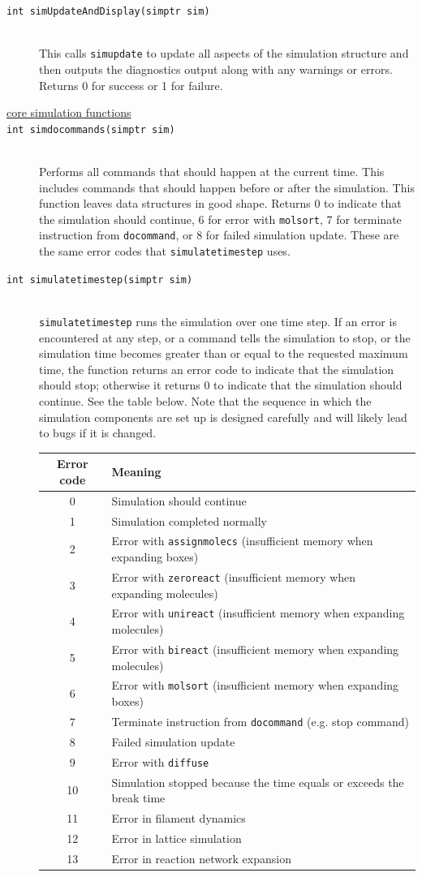 \documentclass {scrbook}
\newcommand {\ttt} {\texttt}
\begin{document}
\begin{description}
\item[\ttt{int simUpdateAndDisplay(simptr sim)}]
\hfill \\
This calls \ttt{simupdate} to update all aspects of the simulation structure and then outputs the diagnostics output along with any warnings or errors. Returns 0 for success or 1 for failure.

\item[\underline{core simulation functions}]

\item[\ttt{int simdocommands(simptr sim)}]
\hfill \\
Performs all commands that should happen at the current time. This includes commands that should happen before or after the simulation. This function leaves data structures in good shape. Returns 0 to indicate that the simulation should continue, 6 for error with \ttt{molsort}, 7 for terminate instruction from \ttt{docommand}, or 8 for failed simulation update. These are the same error codes that \ttt{simulatetimestep} uses.

\item[\ttt{int simulatetimestep(simptr sim)}]
\hfill \\
\ttt{simulatetimestep} runs the simulation over one time step. If an error is encountered at any step, or a command tells the simulation to stop, or the simulation time becomes greater than or equal to the requested maximum time, the function returns an error code to indicate that the simulation should stop; otherwise it returns 0 to indicate that the simulation should continue. See the table below. Note that the sequence in which the simulation components are set up is designed carefully and will likely lead to bugs if it is changed.

\begin{longtable}[c]{cl}
Error code&Meaning\\
\hline
0&Simulation should continue\\
1&Simulation completed normally\\
2&Error with \ttt{assignmolecs} (insufficient memory when expanding boxes)\\
3&Error with \ttt{zeroreact} (insufficient memory when expanding molecules)\\
4&Error with \ttt{unireact} (insufficient memory when expanding molecules)\\
5&Error with \ttt{bireact} (insufficient memory when expanding molecules)\\
6&Error with \ttt{molsort} (insufficient memory when expanding boxes)\\
7&Terminate instruction from \ttt{docommand} (e.g. stop command)\\
8&Failed simulation update\\
9&Error with \ttt{diffuse}\\
10&Simulation stopped because the time equals or exceeds the break time\\
11&Error in filament dynamics\\
12&Error in lattice simulation\\
13&Error in reaction network expansion
\end{longtable}


\end{description}
\end{document}
